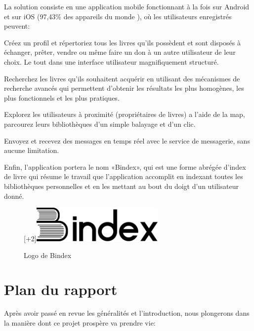 La solution consiste en une application mobile fonctionnant à la fois sur Android et sur iOS (97,43\% des appareils du monde \cite{noauthor_mobile_nodate}), où les utilisateurs enregistrés peuvent:

\begin{list}{•}{}
	\item Créez un profil et répertoriez tous les livres qu’ils possèdent et sont disposés à échanger, prêter, vendre ou même faire un don à un autre utilisateur de leur choix. Le tout dans une interface utilisateur magnifiquement structuré.
	\item Recherchez les livres qu'ils souhaitent acquérir en utilisant des mécanismes de recherche avancés qui permettent d'obtenir les résultats les plus homogènes, les plus fonctionnels et les plus pratiques.
	\item Explorez les utilisateurs à proximité (propriétaires de livres) a l'aide de la map, parcourez leurs bibliothèques d'un simple balayage et d'un clic.
	\item Envoyez et recevez des messages en temps réel avec le service de messagerie, sans aucune limitation.
\end{list}

Enfin, l’application portera le nom «Bindex», qui est une forme abrégée d’index de livre qui résume le travail que l’application accomplit en indexant toutes les bibliothèques personnelles et en les mettant au bout du doigt d’un utilisateur donné.

\begin{figure}[h]
	\begin{center}
		\raisebox{0pt}[\dimexpr\height+2\baselineskip\relax]{\includegraphics[width=6.5cm]{Images/chapter1/bindexLogo.png}}
		\caption{{\footnotesize Logo de Bindex}}
	\end{center}
\end{figure}

\section{Plan du rapport}
\paragraph*{}
Après avoir passé en revue les généralités et l’introduction, nous plongerons dans la manière dont ce projet prospère va prendre vie:
